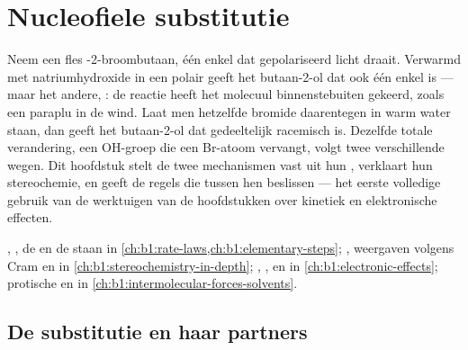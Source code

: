 \chapter{Nucleofiele substitutie}\label{ch:b1:nucleophilic-substitution}

Neem een fles -2-broombutaan, één enkel  dat
gepolariseerd licht draait. Verwarmd met natriumhydroxide in een polair
 geeft het butaan-2-ol dat ook één enkel 
is --- maar het andere, : de reactie heeft het molecuul
binnenstebuiten gekeerd, zoals een paraplu in de wind. Laat men hetzelfde
bromide daarentegen in warm water staan, dan geeft het butaan-2-ol dat
gedeeltelijk racemisch is. Dezelfde totale verandering, een OH-groep die
een Br-atoom vervangt, volgt twee verschillende wegen. Dit hoofdstuk
stelt de twee mechanismen vast uit hun , verklaart hun
stereochemie, en geeft de regels die tussen hen beslissen --- het eerste
volledige gebruik van de werktuigen van de hoofdstukken over kinetiek en
elektronische effecten.

\begin{recall}
, , de  en de
 staan in
\cref{ch:b1:rate-laws,ch:b1:elementary-steps}; ,
weergaven volgens Cram en  in
\cref{ch:b1:stereochemistry-in-depth}; , ,
 en  in \cref{ch:b1:electronic-effects};
protische en  in
\cref{ch:b1:intermolecular-forces-solvents}.
\end{recall}

\section{De substitutie en haar partners}

